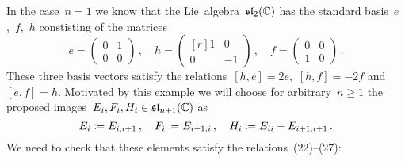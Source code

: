 In the case~$n = 1$ we know that the Lie~algebra~$\mathfrak{sl}_2(\mathbb{C})$ has the standard basis~$e$,~$f$,~$h$ constisting of the matrices
\[
  e
  =
  \begin{pmatrix}
    0 & 1 \\
    0 & 0
  \end{pmatrix} \,,
  \quad
  h
  =
  \begin{pmatrix*}[r]
    1 &  0  \\
    0 & -1
  \end{pmatrix*}  \,,
  \quad
  f
  =
  \begin{pmatrix}
    0 & 0 \\
    1 & 0
  \end{pmatrix} \,.
\]
These three basis vectors satisfy the relations~$[h,e] = 2e$,~$[h,f] = -2f$ and~$[e,f] = h$.
Motivated by this example we will choose for arbitrary~$n \geq 1$ the proposed images~$E_i, F_i, H_i \in \mathfrak{sl}_{n+1}(\mathbb{C})$ as
\[
  E_i
  \coloneqq
  E_{i,i+1} \,,
  \quad
  F_i
  \coloneqq
  E_{i+1,i} \,,
  \quad
  H_i
  \coloneqq
  E_{ii} - E_{i+1,i+1}  \,.
\]
We need to check that these elements satisfy the relations~(22)--(27):
